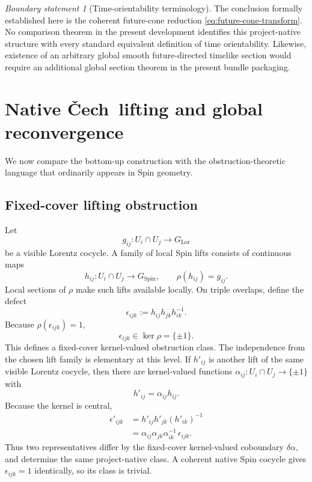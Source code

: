 \documentclass[11pt,a4paper]{article}
\theoremstyle{definition}
\theoremstyle{remark}
\newtheorem{boundary}[theorem]{Boundary statement}
\newcommand{\SpinG}{G_{\mathrm{Spin}}}
\newcommand{\LorG}{G_{\mathrm{Lor}}}
\newcommand{\Cech}{\ifmmode\text{\v{C}ech}\else\v{C}ech\fi}
\begin{document}
\begin{boundary}[Time-orientability terminology]
\label{bdry:timeorientation}
The conclusion formally established here is the coherent future-cone
reduction \eqref{eq:future-cone-transform}.  No comparison theorem in the present development
identifies this project-native structure with every standard equivalent
definition of time orientability.  Likewise, existence of an arbitrary
global smooth future-directed timelike section would require an additional
global section theorem in the present bundle packaging.
\end{boundary}

\clearpage
\section{Native \Cech\ lifting and global reconvergence}
\label{sec:reconvergence}

We now compare the bottom-up construction with the obstruction-theoretic
language that ordinarily appears in Spin geometry.

\subsection{Fixed-cover lifting obstruction}

Let
\[
   g_{ij}:U_i\cap U_j\to\LorG
\]
be a visible Lorentz cocycle.  A family of local Spin lifts consists of
continuous maps
\[
   h_{ij}:U_i\cap U_j\to\SpinG,
   \qquad
   \rho(h_{ij})=g_{ij}.
\tag{9.1}
\]
Local sections of \(\rho\) make such lifts available locally.  On triple
overlaps, define the defect
\[
   \epsilon_{ijk}
   :=
   h_{ij}h_{jk}h_{ik}^{-1}.
\tag{9.2}
\]
Because \(\rho(\epsilon_{ijk})=1\),
\[
   \epsilon_{ijk}\in\ker\rho=\{\pm1\}.
\tag{9.3}
\]
This defines a fixed-cover kernel-valued obstruction class.
The independence from the chosen lift family is elementary at this level.
If \(h'_{ij}\) is another lift of the same visible Lorentz cocycle, then
there are kernel-valued functions
\(\alpha_{ij}:U_i\cap U_j\to\{\pm1\}\) with
\[
    h'_{ij}=\alpha_{ij}h_{ij}.
\]
Because the kernel is central,
\[
\begin{aligned}
 \epsilon'_{ijk}
 &=h'_{ij}h'_{jk}(h'_{ik})^{-1}\\
 &=\alpha_{ij}\alpha_{jk}\alpha_{ik}^{-1}\,
   \epsilon_{ijk}.
\end{aligned}
\tag{9.3a}\label{eq:obstruction-coboundary}
\]
Thus two representatives differ by the fixed-cover kernel-valued
coboundary \(\delta\alpha\), and determine the same project-native class.
A coherent native Spin cocycle gives \(\epsilon_{ijk}=1\) identically, so
its class is trivial.
\end{document}
